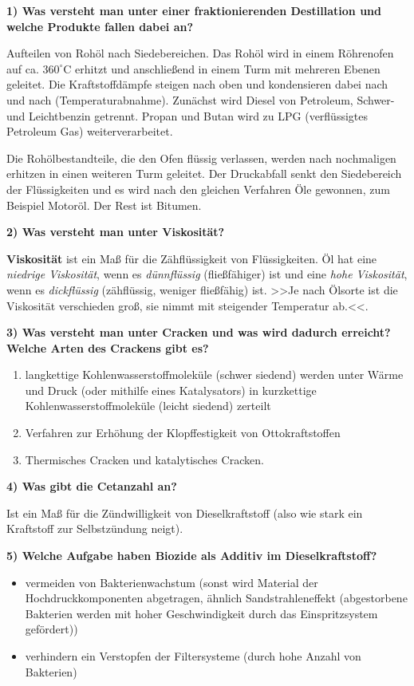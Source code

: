 \textbf{1) Was versteht man unter einer fraktionierenden Destillation
und welche Produkte fallen dabei an?}

Aufteilen von Rohöl nach Siedebereichen. Das Rohöl wird in einem
Röhrenofen auf ca. $360^\circ\text{C}$ erhitzt und anschließend in
einem Turm mit mehreren Ebenen geleitet. Die Kraftstoffdämpfe steigen
nach oben und kondensieren dabei nach und nach (Temperaturabnahme).
Zunächst wird Diesel von Petroleum, Schwer- und Leichtbenzin getrennt.
Propan und Butan wird zu LPG (verflüssigtes Petroleum Gas)
weiterverarbeitet.

Die Rohölbestandteile, die den Ofen flüssig verlassen, werden nach
nochmaligen erhitzen in einen weiteren Turm geleitet. Der Druckabfall
senkt den Siedebereich der Flüssigkeiten und es wird nach den gleichen
Verfahren Öle gewonnen, zum Beispiel Motoröl. Der Rest ist Bitumen.

\textbf{2) Was versteht man unter Viskosität?}

\textbf{Viskosität} ist ein Maß für die Zähflüssigkeit von
Flüssigkeiten. Öl hat eine \emph{niedrige Viskosität}, wenn es
\emph{dünnflüssig} (fließfähiger) ist und eine \emph{hohe Viskosität},
wenn es \emph{dickflüssig} (zähflüssig, weniger fließfähig) ist. >>Je
nach Ölsorte ist die Viskosität verschieden groß, sie nimmt mit
steigender Temperatur ab.<<.

\textbf{3) Was versteht man unter Cracken und was wird dadurch erreicht?
Welche Arten des Crackens gibt es?}

\begin{enumerate}
\item
  langkettige Kohlenwasserstoffmoleküle (schwer siedend) werden unter
  Wärme und Druck (oder mithilfe eines Katalysators) in kurzkettige
  Kohlenwasserstoffmoleküle (leicht siedend) zerteilt
\item
  Verfahren zur Erhöhung der Klopffestigkeit von Ottokraftstoffen
\item
  Thermisches Cracken und katalytisches Cracken.
\end{enumerate}

\textbf{4) Was gibt die Cetanzahl an?}

Ist ein Maß für die Zündwilligkeit von Dieselkraftstoff (also wie stark
ein Kraftstoff zur Selbstzündung neigt).

\textbf{5) Welche Aufgabe haben Biozide als Additiv im
Dieselkraftstoff?}

\begin{itemize}
\item
  vermeiden von Bakterienwachstum (sonst wird Material der
  Hochdruckkomponenten abgetragen, ähnlich Sandstrahleneffekt
  (abgestorbene Bakterien werden mit hoher Geschwindigkeit durch das
  Einspritzsystem gefördert))
\item
  verhindern ein Verstopfen der Filtersysteme (durch hohe Anzahl von
  Bakterien)
\end{itemize}

